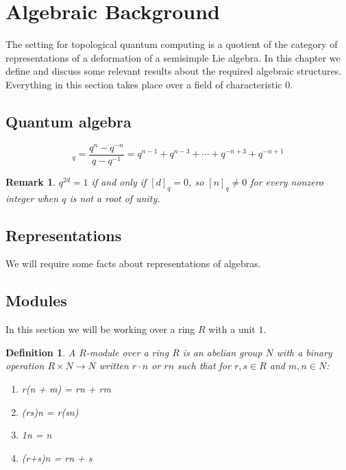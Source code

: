\documentclass[]{article}
\newtheorem{remark}[theorem]{Remark}
\newtheorem{defn}[theorem]{Definition}
\numberwithin{equation}{subsection}
\begin{document}
\tableofcontents
\section{Algebraic Background}

The setting for topological quantum computing is a quotient of the category of
representations of a deformation of a semisimple Lie algebra. In this chapter
we define and discuss some relevant results about the required algebraic
structures. Everything in this section takes place over a field of
characteristic 0.

\subsection{Quantum algebra}

\begin{equation}
    [n]_q = \frac{q^n - q^{-n}}{q - q^{-1}} = q^{n-1} + q^{n-3} + \cdots + q^{-n+3} + q^{-n+1}
\end{equation}

\begin{remark}
$q^{2d}=1$ if and only if $[d]_q = 0$, so $[n]_q \neq 0$ for every nonzero integer when $q$ is not a root of unity. 
\end{remark}


\subsection{Representations}

We will require some facts about representations of algebras. 

\subsection{Modules}

In  this section we will be working over a ring $R$ with a unit $1$. 
\begin{defn}
    A $R$-\emph{module} over a ring $R$ is an abelian group $N$ with a binary
    operation $R \times N \to N$ written $r\cdot n$ or $rn$ such that for $r,s \in R$ and $m,n \in N$:

    \begin{enumerate}
        \item r(n + m) = rn + rm
        \item (rs)n = r(sn)
        \item 1n = n
        \item (r+s)n = rn + s
    \end{enumerate}
\end{defn}
\end{document}
